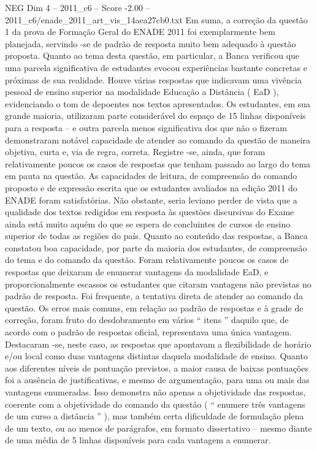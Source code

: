 \begin{textsample}{NEG Dim 4 – 2011\_c6 – Score -2.00 – 2011\_c6/enade\_2011\_art\_vis\_14aea27cb0.txt}
Em suma, a correção da questão 1 da prova de Formação Geral do ENADE 2011 foi exemplarmente bem planejada, servindo -se de padrão de resposta muito bem adequado à questão proposta.
Quanto ao tema desta questão, em particular, a Banca verificou que uma parcela significativa de estudantes evocou experiências bastante concretas e próximas de sua realidade.
Houve várias respostas que indicavam uma vivência pessoal de ensino superior na modalidade Educação a Distância ( EaD ), evidenciando o tom de depoentes nos textos apresentados.
Os estudantes, em sua grande maioria, utilizaram parte considerável do espaço de 15 linhas disponíveis para a resposta – e outra parcela menos significativa dos que não o fizeram demonstraram notável capacidade de atender ao comando da questão de maneira objetiva, curta e, via de regra, correta.
Registre -se, ainda, que foram relativamente poucos os casos de respostas que tenham passado ao largo do tema em pauta na questão.
As capacidades de leitura, de compreensão do comando proposto e de expressão escrita que os estudantes avaliados na edição 2011 do ENADE foram satisfatórias.
Não obstante, seria leviano perder de vista que a qualidade dos textos redigidos em resposta às questões discursivas do Exame ainda está muito aquém do que se espera de concluintes de cursos de ensino superior de todas as regiões do país.
Quanto ao conteúdo das respostas, a Banca constatou boa capacidade, por parte da maioria dos estudantes, de compreensão do tema e do comando da questão.
Foram relativamente poucos os casos de respostas que deixaram de enumerar vantagens da modalidade EaD, e proporcionalmente escassos os estudantes que citaram vantagens não previstas no padrão de resposta.
Foi frequente, a tentativa direta de atender ao comando da questão.
Os erros mais comuns, em relação ao padrão de respostas e à grade de correção, foram fruto do desdobramento em vários “ itens ” daquilo que, de acordo com o padrão de respostas oficial, representava uma única vantagem.
Destacaram -se, neste caso, as respostas que apontavam a flexibilidade de horário e/ou local como duas vantagens distintas daquela modalidade de ensino.
Quanto aos diferentes níveis de pontuação previstos, a maior causa de baixas pontuações foi a ausência de justificativas, e mesmo de argumentação, para uma ou mais das vantagens enumeradas.
Isso demonstra não apenas a objetividade das respostas, coerente com a objetividade do comando da questão ( “ enumere três vantagens de um curso a distância ” ), mas também certa dificuldade de formulação plena de um texto, ou ao menos de parágrafos, em formato dissertativo – mesmo diante de uma média de 5 linhas disponíveis para cada vantagem a enumerar.

\end{textsample}
